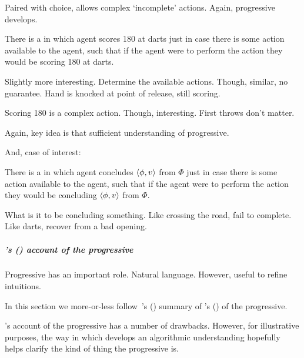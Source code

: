 \begin{note}
  Paired with choice, allows complex `incomplete' actions.
  Again, progressive develops.

  \begin{illustration}[Darts]
    There is a \pevent{} in which agent scores 180 at darts just in case there is some action available to the agent, such that if the agent were to perform the action they would be scoring 180 at darts.
  \end{illustration}

  Slightly more interesting.
  Determine the available actions.
  Though, similar, no guarantee.
  Hand is knocked at point of release, still scoring.

  Scoring 180 is a complex action.
  Though, interesting.
  First throws don't matter.

  Again, key idea is that sufficient understanding of progressive.

  And, case of interest:

  \begin{illustration}[Concluding]
    There is a \pevent{} in which agent concludes \(\langle \phi, v \rangle\) from \(\Phi\) just in case there is some action available to the agent, such that if the agent were to perform the action they would be concluding \(\langle \phi, v \rangle\) from \(\Phi\).
  \end{illustration}

  What is it to be concluding something.
  Like crossing the road, fail to complete.
  Like darts, recover from a bad opening.
\end{note}

\subparagraph{\citeauthor{Landman:1992wh}'s (\citeyear{Landman:1992wh}) account of the progressive}
\label{cha:sec:fcs-def:progressive-landman}
\nocite{Portner:1998um}
\nocite{Engelberg:1999vi}

\begin{note}
  Progressive has an important role.
  Natural language.
  However, useful to refine intuitions.

  In this section we more-or-less follow~\citeauthor{Portner:1998um}'s (\citeyear{Portner:1998um}) summary of \citeauthor{Landman:1992wh}'s (\citeyear{Landman:1992wh}) of the progressive.

  \citeauthor{Landman:1992wh}'s account of the progressive has a number of drawbacks.
  However, for illustrative purposes, the way in which \citeauthor{Landman:1992wh} develops an algorithmic understanding hopefully helps clarify the kind of thing the progressive is.
\end{note}

